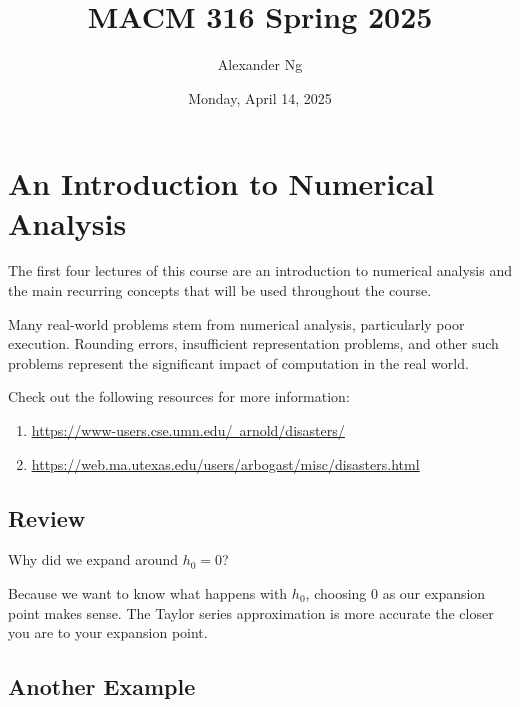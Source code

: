 \documentclass[12pt]{book}
\newcommand{\ulhref}[2]{\href{#1}{\color{blue}\uline{#2}}}
\begin{document}
\title{MACM 316 Spring 2025}
\author{Alexander Ng}
\date{Monday, April 14, 2025}

\maketitle

\tableofcontents
\clearpage

\chapter{An Introduction to Numerical Analysis}
\begin{greenquote}
  The first four lectures of this course are an introduction to numerical
  analysis and the main recurring concepts that will be used throughout the
  course.
\end{greenquote}
Many real-world problems stem from numerical analysis, particularly poor 
execution. Rounding errors, insufficient representation problems, and other 
such problems represent the significant impact of computation in the real world.

Check out the following resources for more information:
\begin{enumerate}
  \item \ulhref{https://www-users.cse.umn.edu/~arnold/disasters/}{https://www-users.cse.umn.edu/~arnold/disasters/}
  \item \ulhref{https://web.ma.utexas.edu/users/arbogast/misc/disasters.html}{https://web.ma.utexas.edu/users/arbogast/misc/disasters.html}
\end{enumerate}


% 
% 
% 
% 
\section{Review}

Why did we expand around $h_0 = 0$?

\quad Because we want to know what happens with $h_0$, choosing $0$ as our 
expansion point makes sense. The Taylor series approximation is more accurate 
the closer you are to your expansion point.


\section{Another Example}
\end{document}
